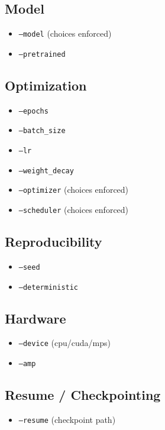 \documentclass[11pt]{article}
\begin{document}
\subsection{Model}
\begin{itemize}
    \item \texttt{--model} (choices enforced)
    \item \texttt{--pretrained}
\end{itemize}

\subsection{Optimization}
\begin{itemize}
    \item \texttt{--epochs}
    \item \texttt{--batch\_size}
    \item \texttt{--lr}
    \item \texttt{--weight\_decay}
    \item \texttt{--optimizer} (choices enforced)
    \item \texttt{--scheduler} (choices enforced)
\end{itemize}

\subsection{Reproducibility}
\begin{itemize}
    \item \texttt{--seed}
    \item \texttt{--deterministic}
\end{itemize}

\subsection{Hardware}
\begin{itemize}
    \item \texttt{--device} (cpu/cuda/mps)
    \item \texttt{--amp}
\end{itemize}

\subsection{Resume / Checkpointing}
\begin{itemize}
    \item \texttt{--resume} (checkpoint path)
\end{itemize}
\end{document}
